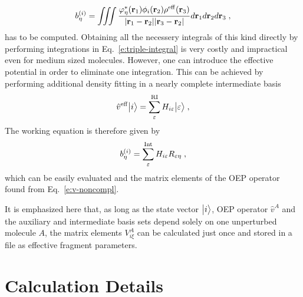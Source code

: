 %
\begin{equation} \label{e:triple-integral}
 b^{(i)}_\eta = \iiint 
           \frac{ \varphi^*_\eta({\bf r}_1) \phi_i({\bf r}_2)  \rho^{\rm eff}({\bf r}_3) }
            {\vert {\bf r}_1 - {\bf r}_2 \vert \vert {\bf r}_3 - {\bf r}_2 \vert}
           d{\bf r}_1 d{\bf r}_2 d{\bf r}_3 \;,
\end{equation}
%
has to be computed.
Obtaining all the necessery integrals of this kind directly 
by performing integrations in Eq.~\eqref{e:triple-integral} is very costly 
and impractical even for medium sized molecules. 
However, one can introduce the effective potential in order to eliminate one integration. 
This can be achieved by performing additional density fitting in a nearly complete intermediate basis 
%
\begin{equation}
 \hat{v}^{\rm eff} \Ket{i} = \sum_\varepsilon^{\rm RI} H_{i\varepsilon} \Ket{\varepsilon} \;,
\end{equation}
%
The working equation is therefore given by
%
\begin{equation}
 b^{(i)}_\eta = \sum_\varepsilon^{\rm Int} H_{i\varepsilon} R_{\varepsilon\eta} \;,
\end{equation}
%
which can be easily evaluated and the matrix elements of the OEP operator found
from Eq.~\eqref{e:v-noncompl}.

It is emphasized here that, as long as the state vector $\Ket{i}$, OEP operator $\hat{v}^A$ 
and the auxiliary and intermediate basis sets depend solely on one unperturbed molecule $A$, the matrix elements
$V^A_{i\xi}$ can be calculated just once and stored in a file as effective fragment parameters.


\section{\label{s:4}Calculation Details}

